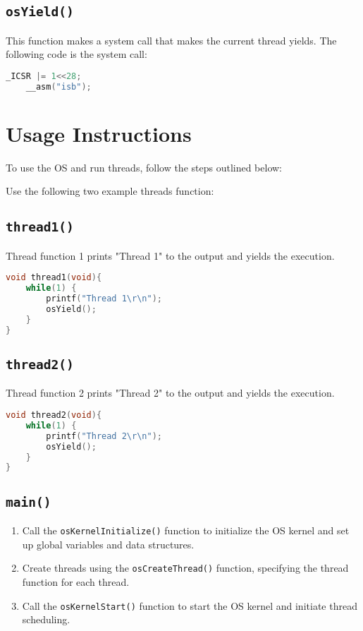 \documentclass{article}
\begin{document}
\subsection{\texttt{osYield()}}
This function makes a system call that makes the current thread yields. The following code is the system call:

\begin{lstlisting}[language=C]
    _ICSR |= 1<<28;
    __asm("isb");\end{lstlisting}
    
\section{Usage Instructions}
To use the OS and run threads, follow the steps outlined below:

Use the following two example threads function:

\subsection{\texttt{thread1()}}
Thread function 1 prints "Thread 1" to the output and yields the execution.
\begin{lstlisting}[language=C]
void thread1(void){
	while(1) {
		printf("Thread 1\r\n");
		osYield();
	}
}
\end{lstlisting}

\subsection{\texttt{thread2()}}
Thread function 2 prints "Thread 2" to the output and yields the execution.
\begin{lstlisting}[language=C]
void thread2(void){
	while(1) {
		printf("Thread 2\r\n");
		osYield();
	}
}\end{lstlisting}

\subsection{\texttt{main()}}
\begin{enumerate}
  \item Call the \texttt{osKernelInitialize()} function to initialize the OS kernel and set up global variables and data structures.
  \item Create threads using the \texttt{osCreateThread()} function, specifying the thread function for each thread.
  \item Call the \texttt{osKernelStart()} function to start the OS kernel and initiate thread scheduling.
\end{enumerate}
\end{document}
